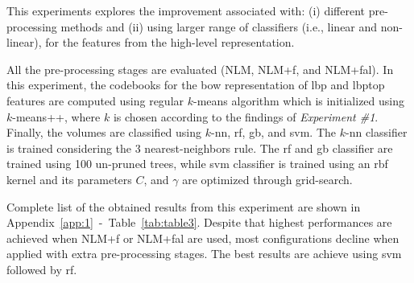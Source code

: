 This experiments explores the improvement associated with: (i) different pre-processing methods and (ii) using larger range of classifiers (i.e., linear and non-linear), for the features from the high-level representation.

All the pre-processing stages are evaluated (NLM, NLM+\acs{f}, and NLM+\acs{fal}).
In this experiment, the codebooks for the \ac{bow} representation of \ac{lbp} and \ac{lbptop} features are computed using regular $k$-means algorithm which is initialized using $k$-means++, where $k$ is chosen according to the findings of \emph{Experiment \#1}.
Finally, the volumes are classified using $k$-\ac{nn}, \ac{rf}, \ac{gb}, and \ac{svm}.
The $k$-\ac{nn} classifier is trained considering the 3 nearest-neighbors rule.
The \ac{rf} and \ac{gb} classifier are trained using 100 un-pruned trees, while \ac{svm} classifier is trained using an \ac{rbf} kernel and its parameters $C$, and $\gamma$ are optimized through grid-search.

Complete list of the obtained results from this experiment are shown in Appendix~\ref{app:1}~-~Table~\ref{tab:table3}.
Despite that highest performances are achieved when NLM+\acs{f} or NLM+\acs{fal} are used, most configurations decline when applied with extra pre-processing stages.
The best results are achieve using \ac{svm} followed by \ac{rf}.

